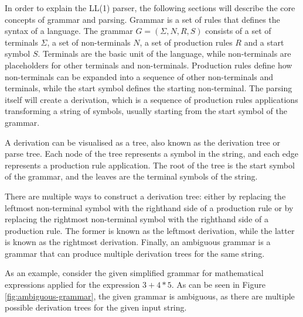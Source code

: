In order to explain the LL(1) parser, the following sections will describe the core concepts of grammar and parsing. Grammar is a set of rules that defines the syntax of a language. The grammar $G = (\Sigma, N, R, S)$ consists of a set of terminals $\Sigma$, a set of non-terminals $N$, a set of production rules $R$ and a start symbol $S$. Terminals are the basic unit of the language, while non-terminals are placeholders for other terminals and non-terminals. Production rules define how non-terminals can be expanded into a sequence of other non-terminals and terminals, while the start symbol defines the starting non-terminal. The parsing itself will create a derivation, which is a sequence of production rules applications transforming a string of symbols, usually starting from the start symbol of the grammar.

A derivation can be visualised as a tree, also known as the derivation tree or parse tree. Each node of the tree represents a symbol in the string, and each edge represents a production rule application. The root of the tree is the start symbol of the grammar, and the leaves are the terminal symbols of the string.

There are multiple ways to construct a derivation tree: either by replacing the leftmost non-terminal symbol with the righthand side of a production rule or by replacing the rightmost non-terminal symbol with the righthand side of a production rule. The former is known as the leftmost derivation, while the latter is known as the rightmost derivation. Finally, an ambiguous grammar is a grammar that can produce multiple derivation trees for the same string.

As an example, consider the given simplified grammar for mathematical expressions applied for the expression $3 + 4 * 5$. As can be seen in Figure \ref{fig:ambiguous-grammar}, the given grammar is ambiguous, as there are multiple possible derivation trees for the given input string.

